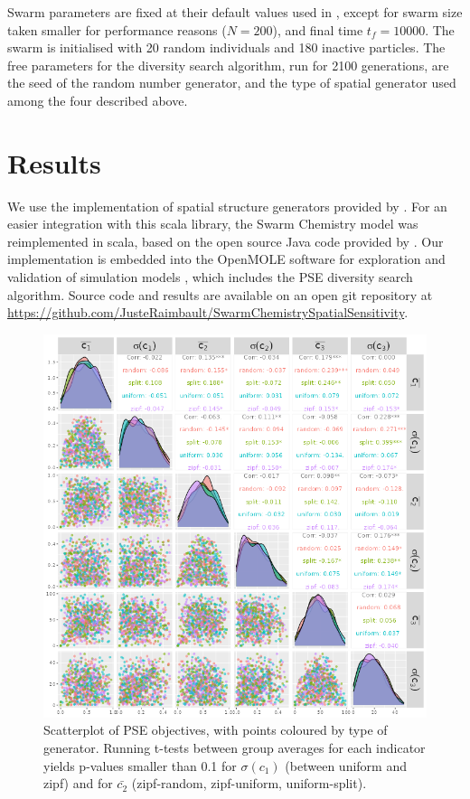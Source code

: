 \documentclass[letterpaper]{article}
\begin{document}
Swarm parameters are fixed at their default values used in \citep{sayama2018seeking}, except for swarm size taken smaller for performance reasons ($N=200$), and final time $t_f = 10000$. The swarm is initialised with 20 random individuals and 180 inactive particles. The free parameters for the diversity search algorithm, run for 2100 generations, are the seed of the random number generator, and the type of spatial generator used among the four described above.

\section{Results}

We use the implementation of spatial structure generators provided by \citep{raimbault2020scala}. For an easier integration with this scala library, the Swarm Chemistry model was reimplemented in scala, based on the open source Java code provided by \citep{sayama2018seeking}. Our implementation is embedded into the OpenMOLE software for exploration and validation of simulation models \citep{reuillon2013openmole}, which includes the PSE diversity search algorithm. Source code and results are available on an open git repository at \url{https://github.com/JusteRaimbault/SwarmChemistrySpatialSensitivity}.


\begin{figure}
    \centering
    \includegraphics[width=\linewidth]{figures/pse-scatterplot_colorGenerator.png}
    \caption{Scatterplot of PSE objectives, with points coloured by type of generator. Running t-tests between group averages for each indicator yields p-values smaller than 0.1 for $\sigma(c_1)$ (between uniform and zipf) and for $\bar{c_2}$ (zipf-random, zipf-uniform, uniform-split).}
    \label{fig:pse}
\end{figure}
\end{document}
